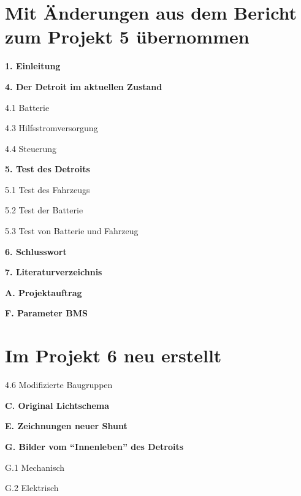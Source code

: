 \section*{Mit Änderungen aus dem Bericht zum Projekt 5 übernommen}
\begin{compactitem}
\item \textbf{1. Einleitung}
\item \textbf{4. Der Detroit im aktuellen Zustand}
\item 4.1 Batterie
\item 4.3 Hilfsstromversorgung
\item 4.4 Steuerung
\item \textbf{5. Test des Detroits}
\item 5.1 Test des Fahrzeugs
\item 5.2 Test der Batterie
\item 5.3 Test von Batterie und Fahrzeug
\item \textbf{6. Schlusswort}
\item \textbf{7. Literaturverzeichnis}
\item \textbf{A. Projektauftrag}
\item \textbf{F. Parameter BMS}
\end{compactitem}

\section*{Im Projekt 6 neu erstellt}
\begin{compactitem}
\item 4.6 Modifizierte Baugruppen
\item \textbf{C. Original Lichtschema}
\item \textbf{E. Zeichnungen neuer Shunt}
\item \textbf{G. Bilder vom "`Innenleben"' des Detroits}
\item G.1 Mechanisch
\item G.2 Elektrisch
\end{compactitem}